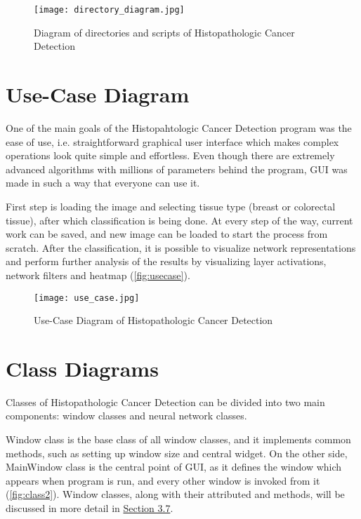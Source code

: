 \begin{figure}[h]
	\centering
	\texttt{[image: directory\_diagram.jpg]}
	\caption{Diagram of directories and scripts of Histopathologic Cancer Detection}
	\label{fig:dirdiag}
\end{figure}

\section{Use-Case Diagram}

One of the main goals of the Histopahtologic Cancer Detection program was the ease of use, i.e. straightforward graphical user interface which makes complex operations look quite simple and effortless. Even though there are extremely advanced algorithms with millions of parameters behind the program, GUI was made in such a way that everyone can use it. 

First step is loading the image and selecting tissue type (breast or colorectal tissue), after which classification is being done. At every step of the way, current work can be saved, and new image can be loaded to start the process from scratch. After the classification, it is possible to visualize network representations and perform further analysis of the results by visualizing layer activations, network filters and heatmap (\textcolor{red}{\autoref{fig:usecase}}).

\begin{figure}[h]
	\centering
	\texttt{[image: use\_case.jpg]}
	\caption{Use-Case Diagram of Histopathologic Cancer Detection}
	\label{fig:usecase}
\end{figure}

\section{Class Diagrams}

Classes of Histopathologic Cancer Detection can be divided into two main components: window classes and neural network classes.

Window class is the base class of all window classes, and it implements common methods, such as setting up window size and central widget. On the other side, MainWindow class is the central point of GUI, as it defines the window which appears when program is run, and every other window is invoked from it (\textcolor{red}{\autoref{fig:class2}}). Window classes, along with their attributed and methods, will be discussed in more detail in \textcolor{red}{\hyperref[gui]{Section 3.7}}.

